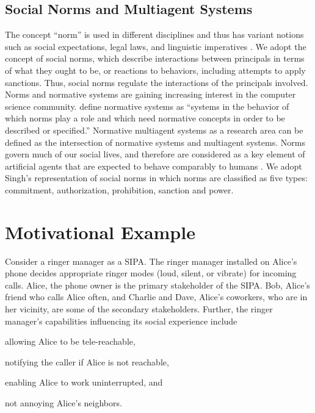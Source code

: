 \subsection{Social Norms and Multiagent Systems}

The concept ``norm'' is used in different disciplines and thus has
variant notions such as social expectations, legal laws, and linguistic
imperatives \citep{Boella2009NormativeSystems}. We adopt the concept of
social norms, which describe interactions between principals in terms of
what they ought to be, or reactions to behaviors, including attempts to
apply sanctions. Thus, social norms regulate the interactions of the
principals involved. Norms and normative systems are gaining increasing
interest in the computer science community. \citet{Meyer+Wieringa-93}
define normative systems as ``systems in the behavior of which norms
play a role and which need normative concepts in order to be described
or specified.'' Normative multiagent systems as a research area can be
defined as the intersection of normative systems and multiagent systems.
Norms govern much of our social lives, and therefore are considered as a
key element of artificial agents that are expected to behave comparably
to humans \citep{boella2006normative}. We adopt Singh's
 representation of social norms in which norms
are classified as five types: commitment, authorization, prohibition,
sanction and power.


\section{Motivational Example}
\begin{example}
\label{ex:intro-ringer-meeting} 
Consider a ringer manager as a SIPA. The ringer manager installed on 
Alice's phone decides appropriate ringer modes (loud, silent, or 
vibrate) for incoming calls. Alice, the phone owner is the 
primary stakeholder of the SIPA. Bob, Alice's friend who 
calls Alice often, and Charlie and Dave, Alice's coworkers, who are in 
her vicinity, are some of the secondary stakeholders. Further, the ringer 
manager's capabilities influencing its social experience include
\begin{enumerate*}[label=(\arabic*)]
\item allowing Alice to be tele-reachable, 
\item notifying the caller if Alice is not reachable,
\item enabling Alice to work uninterrupted, and
\item not annoying Alice's neighbors.
\end{enumerate*}
\end{example}

